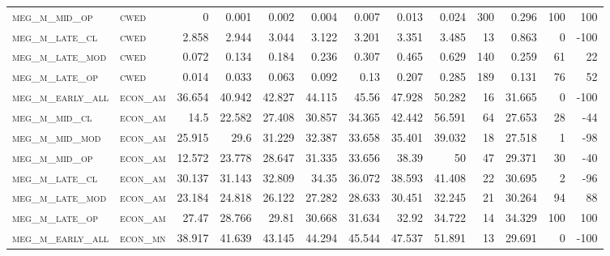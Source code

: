 \begin{landscape}
\begin{center}
\begin{footnotesize}
\begin{longtable}{llrrrrrrrr|rrr}
\textsc{meg\_m\_mid\_op   } & \textsc{cwed      }   & 0        & 0.001    & 0.002    & 0.004    & 0.007    & 0.013    & 0.024     & 300    & 0.296         & 100           & 100             \\
\textsc{meg\_m\_late\_cl  } & \textsc{cwed      }   & 2.858    & 2.944    & 3.044    & 3.122    & 3.201    & 3.351    & 3.485     & 13     & 0.863         & 0             & -100            \\
\textsc{meg\_m\_late\_mod } & \textsc{cwed      }   & 0.072    & 0.134    & 0.184    & 0.236    & 0.307    & 0.465    & 0.629     & 140    & 0.259         & 61            & 22              \\
\textsc{meg\_m\_late\_op  } & \textsc{cwed      }   & 0.014    & 0.033    & 0.063    & 0.092    & 0.13     & 0.207    & 0.285     & 189    & 0.131         & 76            & 52              \\
\textsc{meg\_m\_early\_all} & \textsc{econ\_am  }   & 36.654   & 40.942   & 42.827   & 44.115   & 45.56    & 47.928   & 50.282    & 16     & 31.665        & 0             & -100            \\
\textsc{meg\_m\_mid\_cl   } & \textsc{econ\_am  }   & 14.5     & 22.582   & 27.408   & 30.857   & 34.365   & 42.442   & 56.591    & 64     & 27.653        & 28            & -44             \\
\textsc{meg\_m\_mid\_mod  } & \textsc{econ\_am  }   & 25.915   & 29.6     & 31.229   & 32.387   & 33.658   & 35.401   & 39.032    & 18     & 27.518        & 1             & -98             \\
\textsc{meg\_m\_mid\_op   } & \textsc{econ\_am  }   & 12.572   & 23.778   & 28.647   & 31.335   & 33.656   & 38.39    & 50        & 47     & 29.371        & 30            & -40             \\
\textsc{meg\_m\_late\_cl  } & \textsc{econ\_am  }   & 30.137   & 31.143   & 32.809   & 34.35    & 36.072   & 38.593   & 41.408    & 22     & 30.695        & 2             & -96             \\
\textsc{meg\_m\_late\_mod } & \textsc{econ\_am  }   & 23.184   & 24.818   & 26.122   & 27.282   & 28.633   & 30.451   & 32.245    & 21     & 30.264        & 94            & 88              \\
\textsc{meg\_m\_late\_op  } & \textsc{econ\_am  }   & 27.47    & 28.766   & 29.81    & 30.668   & 31.634   & 32.92    & 34.722    & 14     & 34.329        & 100           & 100             \\
\textsc{meg\_m\_early\_all} & \textsc{econ\_mn  }   & 38.917   & 41.639   & 43.145   & 44.294   & 45.544   & 47.537   & 51.891    & 13     & 29.691        & 0             & -100            \\

\end{longtable}
\end{footnotesize}
\end{center}
\end{landscape}
